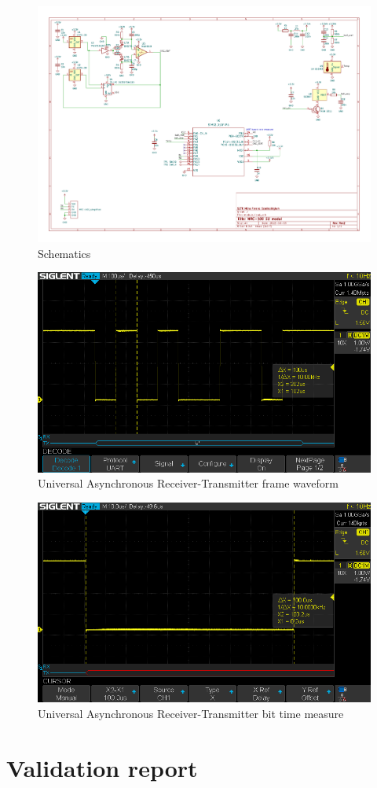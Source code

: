\documentclass[10pt]{datasheet}
\begin{document}
\begin{figure}
	\centering
	\includegraphics[width=1.2\textwidth,angle = 90]{sch}
	\caption{Schematics}
\end{figure}


\begin{figure}
	\centering
	\includegraphics[width=1\textwidth]{SDS1}
	\caption{Universal Asynchronous Receiver-Transmitter frame waveform}
\end{figure}


\begin{figure}
	\centering
	\includegraphics[width=1\textwidth]{SDS2}
	\caption{Universal Asynchronous Receiver-Transmitter bit time measure}
\end{figure}

\newpage
\section{Validation report}

\end{document}
